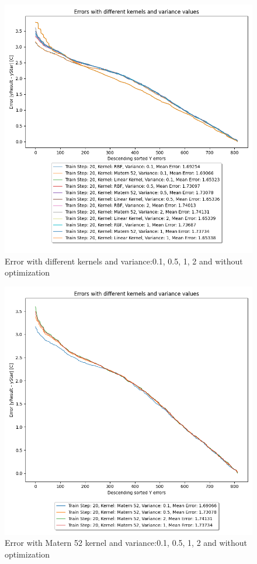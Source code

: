 \documentclass[10pt, a4paper, twocolumn]{article} %
\begin{document}
\begin{figure}[htbp] %
  \centering
  \includegraphics[width=\columnwidth]{pics/TrainStep20_Vtest_withoutOpt.png}
  \caption{Error with different kernels and variance:0.1, 0.5, 1, 2 and without optimization}
  \label{fig:fibonacciPlot}
\end{figure}
\begin{figure}[htbp] %
  \centering
  \includegraphics[width=\columnwidth]{pics/TrainStep20_Vtest_matern_withoutOpt.png}
  \caption{Error with Matern 52 kernel and variance:0.1, 0.5, 1, 2 and without optimization}
  \label{fig:fibonacciPlot}
\end{figure}
\end{document}
